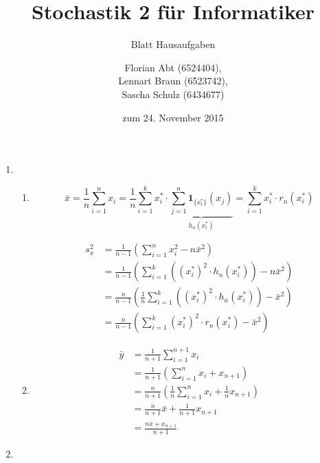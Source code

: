 \documentclass[a4paper]{scrartcl}
\title{Stochastik 2 für Informatiker}
\subtitle{Blatt {\blattnr} Hausaufgaben}
\author{
    Florian Abt (6524404), \\
    Lennart Braun (6523742), \\
    Sascha Schulz (6434677)
}
\date{zum 24. November 2015}
\def \blattnr {6}
\begin{document}
\maketitle

\begin{enumerate}[label=\bfseries \blattnr.\arabic*]

\item
\begin{enumerate}
 \item 
 
 \begin{equation*}
      \bar{x} 
      = \frac1n \sum_{i=1}^n x_i 
      = \frac1n \sum_{i=1}^k x_i^* \cdot \underbrace{\sum_{j=1}^n \mathbf{1}_{\{x_i^*\}}(x_j)}_{h_n(x_i^*)}
      = \sum_{i=1}^k x_i^* \cdot r_n(x_i^*)
 \end{equation*}
 
 \begin{equation*}
  \begin{split}
     s_x^2 
     &= \frac1{n-1} \left( \sum_{i=1}^n x_i^2 - n\bar{x}^2 \right) \\
     &= \frac1{n-1} \left( \sum_{i=1}^k \left( (x_i^*)^2 \cdot h_n(x_i^*) \right) - n\bar{x}^2  \right) \\
     &= \frac{n}{n-1} \left(\frac1n \sum_{i=1}^k \left( (x_i^*)^2 \cdot h_n(x_i^*) \right) - \bar{x}^2  \right) \\
     &= \frac{n}{n-1} \left( \sum_{i=1}^k (x_i^*)^2 \cdot r_n(x_i^*) - \bar{x}^2  \right) 
     \end{split}
 \end{equation*}
 
 \item 
 \begin{equation*}
  \begin{split}
      \bar{y} 
      &= \frac1{n+1} \sum_{i=1}^{n+1} x_i  \\
      &= \frac1{n+1} \left( \sum_{i=1}^{n} x_i + x_{n+1} \right) \\
      &= \frac{n}{n+1} \left( \frac1n \sum_{i=1}^{n} x_i + \frac1n x_{n+1} \right) \\
      &= \frac{n}{n+1} \bar{x} + \frac1{n+1} x_{n+1} \\
      &= \frac{n\bar{x} + x_{n+1}}{n+1}
  \end{split}
 \end{equation*}
 
\end{enumerate}

\item


\end{enumerate}
\end{document}
